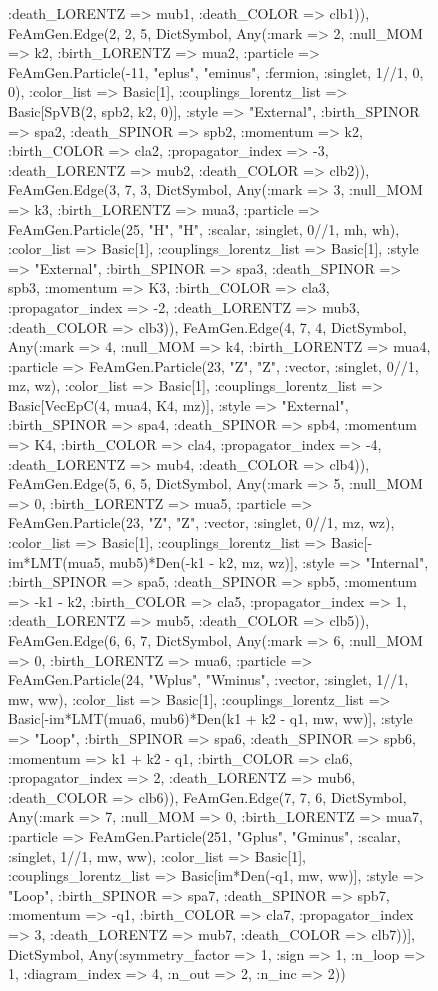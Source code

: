 \documentclass{revtex4}
\begin{document}
\begin{figure}[!htb]
\begin{center}
{:death_LORENTZ => mub1, :death_COLOR => clb1)), FeAmGen.Edge(2, 2, 5, Dict{Symbol, Any}(:mark => 2, :null_MOM => k2, :birth_LORENTZ => mua2, :particle => FeAmGen.Particle(-11, "eplus", "eminus", :fermion, :singlet, 1//1, 0, 0), :color_list => Basic[1], :couplings_lorentz_list => Basic[SpVB(2, spb2, k2, 0)], :style => "External", :birth_SPINOR => spa2, :death_SPINOR => spb2, :momentum => k2, :birth_COLOR => cla2, :propagator_index => -3, :death_LORENTZ => mub2, :death_COLOR => clb2)), FeAmGen.Edge(3, 7, 3, Dict{Symbol, Any}(:mark => 3, :null_MOM => k3, :birth_LORENTZ => mua3, :particle => FeAmGen.Particle(25, "H", "H", :scalar, :singlet, 0//1, mh, wh), :color_list => Basic[1], :couplings_lorentz_list => Basic[1], :style => "External", :birth_SPINOR => spa3, :death_SPINOR => spb3, :momentum => K3, :birth_COLOR => cla3, :propagator_index => -2, :death_LORENTZ => mub3, :death_COLOR => clb3)), FeAmGen.Edge(4, 7, 4, Dict{Symbol, Any}(:mark => 4, :null_MOM => k4, :birth_LORENTZ => mua4, :particle => FeAmGen.Particle(23, "Z", "Z", :vector, :singlet, 0//1, mz, wz), :color_list => Basic[1], :couplings_lorentz_list => Basic[VecEpC(4, mua4, K4, mz)], :style => "External", :birth_SPINOR => spa4, :death_SPINOR => spb4, :momentum => K4, :birth_COLOR => cla4, :propagator_index => -4, :death_LORENTZ => mub4, :death_COLOR => clb4)), FeAmGen.Edge(5, 6, 5, Dict{Symbol, Any}(:mark => 5, :null_MOM => 0, :birth_LORENTZ => mua5, :particle => FeAmGen.Particle(23, "Z", "Z", :vector, :singlet, 0//1, mz, wz), :color_list => Basic[1], :couplings_lorentz_list => Basic[-im*LMT(mua5, mub5)*Den(-k1 - k2, mz, wz)], :style => "Internal", :birth_SPINOR => spa5, :death_SPINOR => spb5, :momentum => -k1 - k2, :birth_COLOR => cla5, :propagator_index => 1, :death_LORENTZ => mub5, :death_COLOR => clb5)), FeAmGen.Edge(6, 6, 7, Dict{Symbol, Any}(:mark => 6, :null_MOM => 0, :birth_LORENTZ => mua6, :particle => FeAmGen.Particle(24, "Wplus", "Wminus", :vector, :singlet, 1//1, mw, ww), :color_list => Basic[1], :couplings_lorentz_list => Basic[-im*LMT(mua6, mub6)*Den(k1 + k2 - q1, mw, ww)], :style => "Loop", :birth_SPINOR => spa6, :death_SPINOR => spb6, :momentum => k1 + k2 - q1, :birth_COLOR => cla6, :propagator_index => 2, :death_LORENTZ => mub6, :death_COLOR => clb6)), FeAmGen.Edge(7, 7, 6, Dict{Symbol, Any}(:mark => 7, :null_MOM => 0, :birth_LORENTZ => mua7, :particle => FeAmGen.Particle(251, "Gplus", "Gminus", :scalar, :singlet, 1//1, mw, ww), :color_list => Basic[1], :couplings_lorentz_list => Basic[im*Den(-q1, mw, ww)], :style => "Loop", :birth_SPINOR => spa7, :death_SPINOR => spb7, :momentum => -q1, :birth_COLOR => cla7, :propagator_index => 3, :death_LORENTZ => mub7, :death_COLOR => clb7))], Dict{Symbol, Any}(:symmetry_factor => 1, :sign => 1, :n_loop => 1, :diagram_index => 4, :n_out => 2, :n_inc => 2)) 
}
\end{center}
\end{figure}
\end{document}
